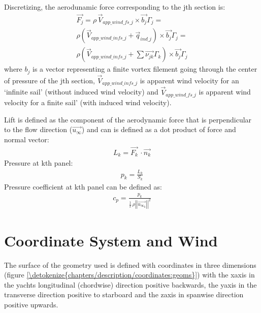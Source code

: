 \documentclass[letterpaper,10pt,english]{jupyterBook}
\begin{document}
\sphinxAtStartPar
Discretizing, the aerodunamic force corresponding to the j\sphinxhyphen{}th section is:
\begin{equation*}
\begin{split}
\overrightarrow{F_{j}}=\rho\,\overrightarrow{V}_{app\_wind\_fs\_j} \times \overrightarrow{b_j}\Gamma_{j} = \\
\rho(\overrightarrow{V}_{app\_wind\_infs\_j} + \overrightarrow{q}_{ind\_j}) \times \overrightarrow{b_j}\Gamma_{j} = \\
\rho(\overrightarrow{V}_{app\_wind\_infs\_j} +
\sum{\overrightarrow{\nu_{jk}}\Gamma_{k}}) \times \overrightarrow{b_j}\Gamma_{j}
\end{split}
\end{equation*}
\sphinxAtStartPar
where \(b_j\) is a vector representing a finite vortex filement going through the center of pressure of the j\sphinxhyphen{}th section, \(\overrightarrow{V}_{app\_wind\_infs\_j}\) is apparent wind velocity for an ‘infinite sail’ (without induced wind velocity) and \(\overrightarrow{V}_{app\_wind\_fs\_j}\) is apparent wind velocity for a finite sail’ (with induced wind velocity).

\sphinxAtStartPar
Lift is defined as the component of the aerodynamic force that is perpendicular to the flow direction (\(\overrightarrow{u_{\infty}}\)) and can is defined as a dot product of force and normal vector:
\begin{equation*}
\begin{split}
L_k=\overrightarrow{F_k}\,\cdot \overrightarrow{n_k}
\end{split}
\end{equation*}
\sphinxAtStartPar
Pressure at k\sphinxhyphen{}th panel:
\begin{equation*}
\begin{split}
p_k=\frac{L_k}{S_k}
\end{split}
\end{equation*}
\sphinxAtStartPar
Pressure coefficient at k\sphinxhyphen{}th panel can be defined as:
\begin{equation*}
\begin{split}
c_p=\frac{p_k}{\frac{1}{2}\, \rho {\left|\left|\overrightarrow{u_{\infty_k}}\right|\right|}^2}
\end{split}
\end{equation*}


\sphinxstepscope


\chapter{Coordinate System and Wind}
\label{\detokenize{chapters/description/coordinates:coordinate-system-and-wind}}\label{\detokenize{chapters/description/coordinates::doc}}
\sphinxAtStartPar
The surface of the geometry used is defined with coordinates in three dimensions (figure \hyperref[\detokenize{chapters/description/coordinates:geoms}]{\ref{\detokenize{chapters/description/coordinates:geoms}}})  with the x\sphinxhyphen{}axis in the yachts longitudinal (chordwise) direction positive backwards, the y\sphinxhyphen{}axis in the transverse direction positive to starboard and the z\sphinxhyphen{}axis in spanwise direction positive upwards.
\end{document}
